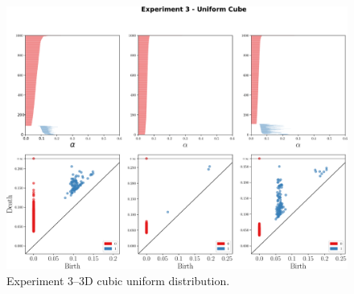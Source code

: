 \documentclass[10pt]{article}
\theoremstyle{definition}
\begin{document}
\begin{figure}[!htpb]
     \centering
     \includegraphics[width=\textwidth]{./figures/experiment-3-pd.pdf}
     \caption{Experiment $3$--$3$D cubic uniform distribution.}%
     \label{Fig:persistence_exp2b}
\end{figure}



\end{document}
